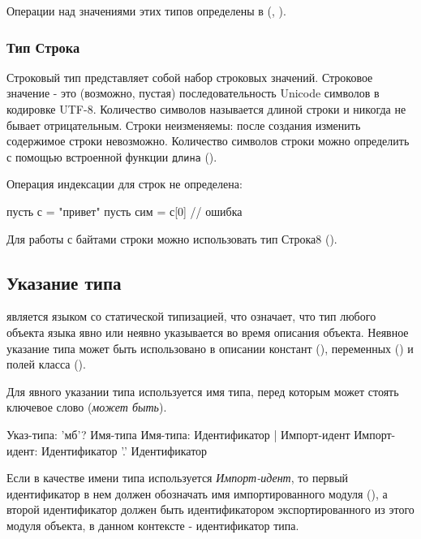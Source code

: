 \bigskip
Операции над значениями этих типов определены в (, ).

\hypertarget{string-type}{%
\subsubsection{Тип Строка}\label{decls:string-type}}

Строковый тип представляет собой набор строковых значений. Строковое значение - это (возможно, пустая) последовательность Unicode символов в кодировке UTF-8.
Количество символов называется длиной строки и никогда не бывает отрицательным. 
Строки неизменяемы: после создания изменить содержимое строки невозможно. 
Количество символов строки можно определить с помощью встроенной функции \verb+длина+ ().

Операция индексации для строк не определена:
\begin{SampleErr}[vspace=2pt]
    пусть с = "привет"
    пусть сим = с[0] // ошибка
\end{SampleErr}

Для работы с байтами строки можно использовать тип Строка8 ().

\hypertarget{type-ref}{%
\subsection{Указание типа}\label{decls:type-ref}}

\thelang{} является языком со статической типизацией, что означает, что тип любого объекта языка явно или неявно указывается во время описания объекта. 
Неявное указание типа может быть использовано в описании констант (), переменных () и полей класса ().

Для явного указании типа используется имя типа, перед которым может стоять ключевое слово  (\emph{может быть}). 

\begin{Grammar}
Указ-типа: 'мб'? Имя-типа 
Имя-типа: Идентификатор | Импорт-идент
Импорт-идент: Идентификатор '.' Идентификатор
\end{Grammar} 

Если в качестве имени типа используется \emph{Импорт-идент}, то первый идентификатор в нем должен обозначать имя импортированного модуля (), а второй идентификатор должен быть идентификатором экспортированного из этого модуля объекта, в данном контексте - идентификатор типа.


